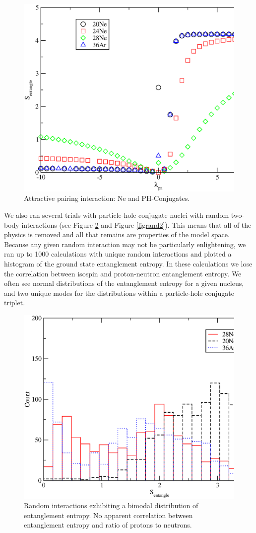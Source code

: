 \begin{figure}
    \centering
    \includegraphics[width=.75\textwidth,clip]{Figures/s_vs_lambda_pair_ne}
    \caption{Attractive pairing interaction: Ne and PH-Conjugates.}
    \label{figpair}
\end{figure}

We also ran several trials with particle-hole conjugate nuclei 
with random two-body interactions (see Figure \ref{figrand1} and Figure \ref{figrand2}). This means that all of the
physics is removed and all that remains are properties of the 
model space. Because any given random interaction may not be particularly 
enlightening, we ran up to 1000 calculations with unique random
interactions and plotted a histogram of the ground state
entanglement entropy. In these calculations we lose the 
correlation between isospin and proton-neutron entanglement 
entropy. We often see normal distributions of the entanglement
entropy for a given nucleus, and two unique modes for the 
distributions within a particle-hole conjugate triplet.

\begin{figure}
    \centering
    \includegraphics[width=.75\textwidth,clip]{Figures/rand_s_ne}
    \caption{Random interactions exhibiting a bimodal distribution of entanglement entropy. No apparent
correlation between entanglement entropy and ratio of protons to neutrons.}
    \label{figrand1}
\end{figure}

